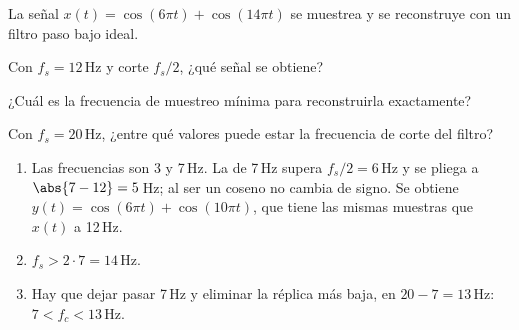 \documentclass[11pt,a4paper]{scrartcl}
\begin{document}
\begin{ejercicio}
  La señal $x(t)=\cos(6\pi t)+\cos(14\pi t)$ se muestrea y se reconstruye con un filtro paso bajo ideal.
  \begin{incisos}[1]
    \item Con $f_s=12$\,Hz y corte $f_s/2$, ¿qué señal se obtiene?
    \item ¿Cuál es la frecuencia de muestreo mínima para reconstruirla exactamente?
    \item Con $f_s=20$\,Hz, ¿entre qué valores puede estar la frecuencia de corte del filtro?
  \end{incisos}
\end{ejercicio}
\begin{solucion}
  \begin{enumerate}[label=\alph*)]
    \item Las frecuencias son 3 y 7\,Hz. La de 7\,Hz supera $f_s/2=6$\,Hz y se pliega a $\abs{7-12}=5$\,Hz; al ser un coseno no cambia de signo. Se obtiene $y(t)=\cos(6\pi t)+\cos(10\pi t)$, que tiene las mismas muestras que $x(t)$ a 12\,Hz.
    \item $f_s>2\cdot7=14$\,Hz.
    \item Hay que dejar pasar 7\,Hz y eliminar la réplica más baja, en $20-7=13$\,Hz: $7<f_c<13$\,Hz.
  \end{enumerate}
\end{solucion}
\end{document}
